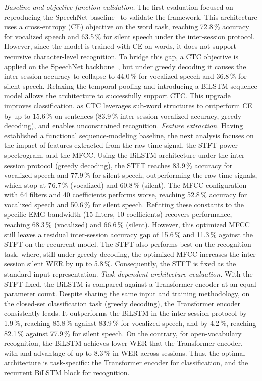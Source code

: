 \documentclass{article}
\begin{document}
\textit{Baseline and objective function validation.} The first evaluation focused on reproducing the SpeechNet baseline~\cite{Spacone2026_SilentWear} to validate the framework. This architecture uses a cross-entropy (CE) objective on the word task, reaching 72.8\,\% accuracy for vocalized speech and 63.5\,\% for silent speech under the inter-session protocol. 
However, since the model is trained with CE on words, it does not support recursive character-level recognition.
To bridge this gap, a CTC objective is applied on the SpeechNet backbone~\cite{Spacone2026_SilentWear}, but under greedy decoding it causes the inter-session accuracy to collapse to 44.0\,\% for vocalized speech and 36.8\,\% for silent speech. Relaxing the temporal pooling and introducing a BiLSTM sequence model allows the architecture to successfully support CTC. This upgrade improves classification, as CTC leverages sub-word structures to outperform CE by up to 15.6\,\% on sentences (83.9\,\% inter-session vocalized accuracy, greedy decoding), and enables unconstrained recognition.
\textit{Feature extraction.} Having established a functional sequence-modeling baseline, the next analysis focuses on the impact of features extracted from the raw time signal, the STFT power spectrogram, and the MFCC. Using the BiLSTM architecture under the inter-session protocol (greedy decoding), the STFT reaches 83.9\,\% accuracy for vocalized speech and 77.9\,\% for silent speech, outperforming the raw time signals, which stop at 76.7\,\% (vocalized) and 60.8\,\% (silent). The MFCC configuration with 64 filters and 40 coefficients performs worse, reaching 52.8\,\% accuracy for vocalized speech and 50.6\,\% for silent speech. Refitting these constants to the specific EMG bandwidth (15 filters, 10 coefficients) recovers performance, reaching 68.3\,\% (vocalized) and 66.6\,\% (silent). However, this optimized MFCC still leaves a residual inter-session accuracy gap of 15.6\,\% and 11.3\,\% against the STFT on the recurrent model. The STFT also performs best on the recognition task, where, still under greedy decoding, the optimized MFCC increases the inter-session silent WER by up to 5.8\,\%. Consequently, the STFT is fixed as the standard input representation.
\textit{Task-dependent architecture evaluation.} With the STFT fixed, the BiLSTM is compared against a Transformer encoder at an equal parameter count. Despite sharing the same input and training methodology, on the closed-set classification task (greedy decoding), the Transformer encoder consistently leads. It outperforms the BiLSTM in the inter-session protocol by 1.9\,\%, reaching 85.8\,\% against 83.9\,\% for vocalized speech, and by 4.2\,\%, reaching 82.1\,\% against 77.9\,\% for silent speech. On the contrary, for open-vocabulary recognition, the BiLSTM achieves lower WER that the Transformer encoder, with and advantage of up to 8.3\,\% in WER across sessions. Thus, the optimal architecture is task-specific: the Transformer encoder for classification, and the recurrent BiLSTM block for recognition.
\end{document}
